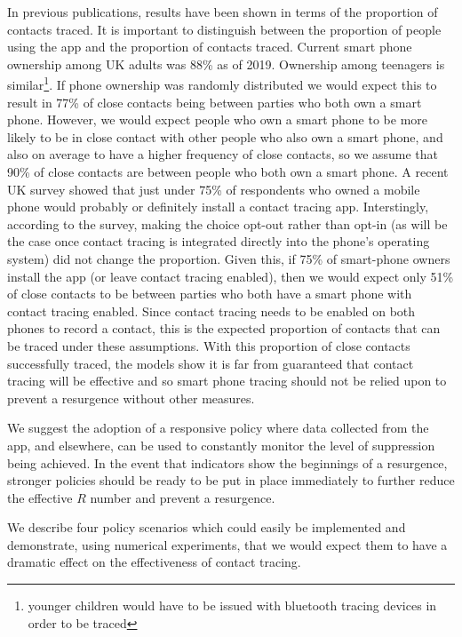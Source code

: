 \documentclass{article}
\begin{document}
In previous publications, results have been shown in terms of the proportion of contacts traced. It is important to distinguish between the proportion of people using the app and the proportion of contacts traced. Current smart phone ownership among UK adults was 88\% as of 2019\cite{deloitte}. Ownership among teenagers is similar\cite{statistica}\footnote{younger children would have to be issued with bluetooth tracing devices in order to be traced}. If phone ownership was randomly distributed we would expect this to result in 77\% of close contacts being between parties who both own a smart phone. However, we would expect people who own a smart phone to be more likely to be in close contact with other people who also own a smart phone, and also on average to have a higher frequency of close contacts, so we assume that 90\% of close contacts are between people who both own a smart phone. A recent UK survey\cite{abeler2020Support} showed that just under 75\% of respondents who owned a mobile phone would probably or definitely install a contact tracing app. Interstingly, according to the survey, making the choice opt-out rather than opt-in (as will be the case once contact tracing is integrated directly into the phone's operating system) did not change the proportion. Given this, if 75\% of smart-phone owners install the app (or leave contact tracing enabled), then we would expect only 51\% of close contacts to be between parties who both have a smart phone with contact tracing enabled. Since contact tracing needs to be enabled on both phones to record a contact, this is the expected proportion of contacts that can be traced under these assumptions. With this proportion of close contacts successfully traced, the models show it is far from guaranteed that contact tracing will be effective and so smart phone tracing should not be relied upon to prevent a resurgence without other measures.

We suggest the adoption of a responsive policy where data collected from the app, and elsewhere, can be used to constantly monitor the level of suppression being achieved. In the event that indicators show the beginnings of a resurgence, stronger policies should be ready to be put in place immediately to further reduce the effective $R$ number and prevent a resurgence.

We describe four policy scenarios which could easily be implemented and demonstrate, using numerical experiments, that we would expect them to have a dramatic effect on the effectiveness of contact tracing.
\end{document}
